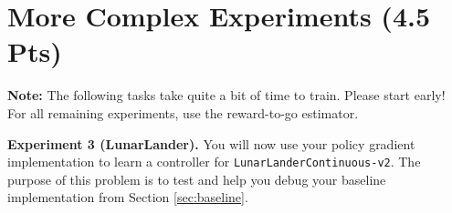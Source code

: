\documentclass{article}
\begin{document}


\section{More Complex Experiments (4.5 Pts)}
\textbf{Note:} The following tasks take quite a bit of time to train. Please start early! For all remaining experiments, use the reward-to-go estimator.

\vspace{0.2in}
\textbf{Experiment 3 (LunarLander).} You will now use your policy gradient implementation to learn a controller for \verb|LunarLanderContinuous-v2|.
The purpose of this problem is to test and help you debug your baseline implementation from Section \ref{sec:baseline}.
\end{document}
